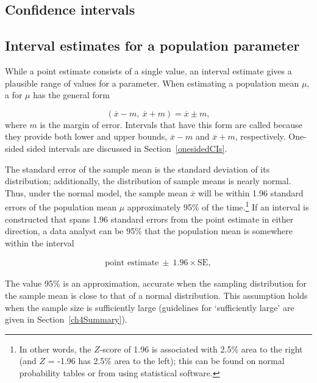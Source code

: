 \begin{spacing}{1.5}

\section[Confidence intervals]{Confidence intervals} %
\label{confidenceIntervals}
\subsection{Interval estimates for a population parameter}

While a point estimate consists of a single value, an interval estimate gives a plausible range of values for a parameter. When estimating a population mean $\mu$, a  for $\mu$ has the general form

\[(\overline{x} -m, \ \overline{x} + m) = \overline{x} \pm m, \]
where $m$ is the margin of error. Intervals that have this form are called  because they provide both lower and upper bounds, $\overline{x} - m$ and $\overline{x} + m$, respectively. One-sided sided intervals are discussed in Section~\ref{onesidedCIs}.

The standard error of the sample mean is the standard deviation of its distribution; additionally, the distribution of sample means is nearly normal. Thus, under the normal model, the sample mean $\overline{x}$ will be within 1.96 standard errors of the population mean $\mu$ approximately 95\% of the time.\footnote{In other words, the $Z$-score of 1.96 is associated with 2.5\% area to the right (and $Z$ = -1.96 has 2.5\% area to the left); this can be found on normal probability tables or from using statistical software.} If an interval is constructed that spans 1.96 standard errors from the point estimate in either direction, a data analyst can be 95\%  that the population mean is somewhere within the interval

\begin{align}
\text{point estimate}\ \pm\ 1.96\times \text{SE}, 
\label{95PercentCIWhenUsingNormalModel}
\end{align}

The value 95\% is an approximation, accurate when the sampling distribution for the sample mean is close to that of a normal distribution. This assumption holds when the sample size is sufficiently large (guidelines for `sufficiently large' are given in Section~\ref{ch4Summary}).


\end{spacing}
